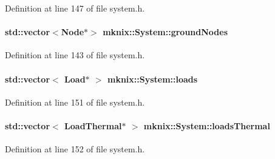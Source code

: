 Definition at line 147 of file system.\+h.

\hypertarget{classmknix_1_1_system_a510d1808d1c0bce06b2d46707d8dddb5}{}
\paragraph[{ground\+Nodes}]{\setlength{\rightskip}{0pt plus 5cm}std\+::vector$<${\bf Node}$\ast$$>$ mknix\+::\+System\+::ground\+Nodes\hspace{0.3cm}{\ttfamily [protected]}}\label{classmknix_1_1_system_a510d1808d1c0bce06b2d46707d8dddb5}


Definition at line 143 of file system.\+h.

\hypertarget{classmknix_1_1_system_a16ca73ebcb7b8608052e1a39766c034d}{}
\paragraph[{loads}]{\setlength{\rightskip}{0pt plus 5cm}std\+::vector$<$ {\bf Load}$\ast$ $>$ mknix\+::\+System\+::loads\hspace{0.3cm}{\ttfamily [protected]}}\label{classmknix_1_1_system_a16ca73ebcb7b8608052e1a39766c034d}


Definition at line 151 of file system.\+h.

\hypertarget{classmknix_1_1_system_a4895395f658cd48585a7336acd9d6625}{}
\paragraph[{loads\+Thermal}]{\setlength{\rightskip}{0pt plus 5cm}std\+::vector$<$ {\bf Load\+Thermal}$\ast$ $>$ mknix\+::\+System\+::loads\+Thermal\hspace{0.3cm}{\ttfamily [protected]}}\label{classmknix_1_1_system_a4895395f658cd48585a7336acd9d6625}


Definition at line 152 of file system.\+h.

\hypertarget{classmknix_1_1_system_a5555b9556c466244816bc6654e73d8f6}{}
